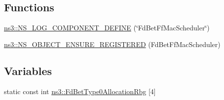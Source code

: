 \subsection*{Functions}
\begin{DoxyCompactItemize}
\item 
\hyperlink{namespacens3_a02429b309d912445a7c677e750fe593d}{ns3\+::\+N\+S\+\_\+\+L\+O\+G\+\_\+\+C\+O\+M\+P\+O\+N\+E\+N\+T\+\_\+\+D\+E\+F\+I\+NE} (\char`\"{}Fd\+Bet\+Ff\+Mac\+Scheduler\char`\"{})
\item 
\hyperlink{namespacens3_a6c5d97222b736ae17d9db96719a68a10}{ns3\+::\+N\+S\+\_\+\+O\+B\+J\+E\+C\+T\+\_\+\+E\+N\+S\+U\+R\+E\+\_\+\+R\+E\+G\+I\+S\+T\+E\+R\+ED} (Fd\+Bet\+Ff\+Mac\+Scheduler)
\end{DoxyCompactItemize}
\subsection*{Variables}
\begin{DoxyCompactItemize}
\item 
static const int \hyperlink{namespacens3_af21457e10b63b34fe10b260e17f0350a}{ns3\+::\+Fd\+Bet\+Type0\+Allocation\+Rbg} \mbox{[}4\mbox{]}
\end{DoxyCompactItemize}
